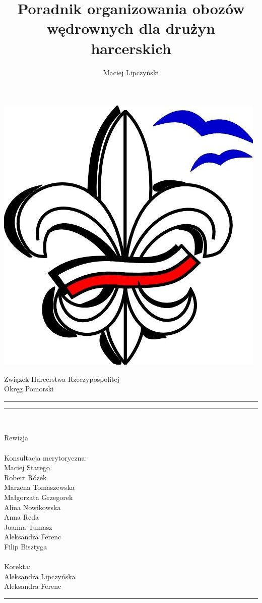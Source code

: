 \documentclass[a5paper,10pt,titlepage,twoside]{article}
\title{Poradnik organizowania obozów wędrownych dla drużyn harcerskich}
\author{Maciej Lipczyński}
\date{\empty} %
\makeatletter
\newcommand{\linia}{\rule{\linewidth}{0.4mm}}
\renewcommand{\maketitle}{\begin{titlepage}
    \begin{flushleft}
    \includegraphics[scale=0.15, keepaspectratio]{lilijka_opom.jpg}
    \end{flushleft}
    \vspace*{1cm}
    \begin{center}\small
    Związek Harcerstwa Rzeczypospolitej\\
    Okręg Pomorski
    \end{center}
    \vspace{1cm}
    \noindent\linia
    \begin{center}
      \LARGE \textsc{\@title}
         \end{center}
     \linia
    \begin{center}
    \@author\\
    \vspace{0.5cm}
    \end{center}
  \end{titlepage}%
}
\makeatother
\begin{document}
\renewcommand{\headwidth}{11.85cm} %

\maketitle
\pagestyle{empty}
\noindent \scriptsize{Rewizja \RCSRevision}\\
\\
Konsultacja merytoryczna:\\
Maciej Starego\\
Robert Różek\\
Marzena Tomaszewska\\
Małgorzata Grzegorek\\
Alina Nowikowska\\
Anna Reda\\
Joanna Tumasz\\
Aleksandra Ferenc\\
Filip Bisztyga\\
\\
Korekta:\\
Aleksandra Lipczyńska\\
Aleksandra Ferenc\\
\noindent\linia\\
\\
\\
\\
\\
\end{document}
